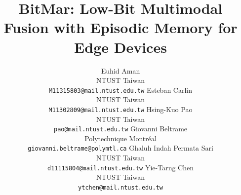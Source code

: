 \documentclass[11pt]{article}
\title{BitMar: Low-Bit Multimodal Fusion with Episodic Memory for Edge Devices}
\author{
  Euhid Aman \\
  NTUST Taiwan \\
  \small \texttt{M11315803@mail.ntust.edu.tw}
  \And
  Esteban Carlin \\
  NTUST Taiwan \\
  \small \texttt{M11302809@mail.ntust.edu.tw}
  \And
  Hsing-Kuo Pao \\
  NTUST Taiwan \\
  \small \texttt{pao@mail.ntust.edu.tw}
  \AND
  Giovanni Beltrame \\
  Polytechnique Montréal \\
  \small \texttt{giovanni.beltrame@polymtl.ca}
  \And
  Ghaluh Indah Permata Sari \\
  NTUST Taiwan \\
  \small \texttt{d11115804@mail.ntust.edu.tw}
  \And
  Yie-Tarng Chen \\
  NTUST Taiwan \\
  \small \texttt{ytchen@mail.ntust.edu.tw}
}
\begin{document}
\maketitle













\FloatBarrier









% 
% 







% 
% 



\end{document}
